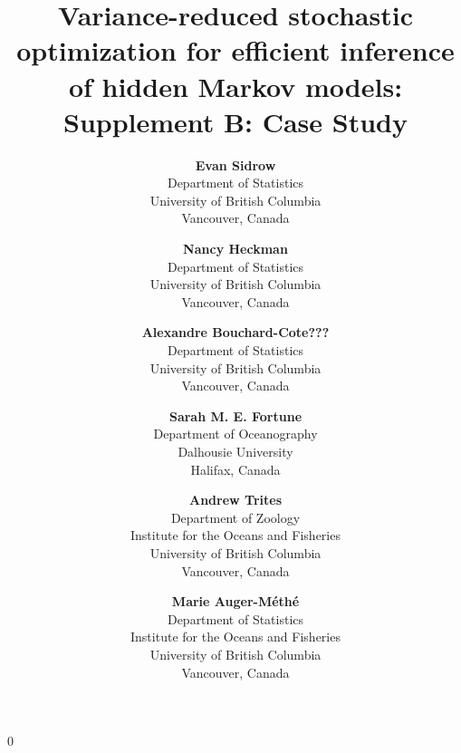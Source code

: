 \documentclass[12pt]{article}
\newcommand{\blind}{0}
\begin{document}
%

\def\spacingset#1{\renewcommand{\baselinestretch}%
{#1}\small\normalsize} \spacingset{1}


\blind
{
    \title{Variance-reduced stochastic optimization for efficient inference of hidden Markov models: Supplement B: Case Study}

    \author{
      \textbf{Evan Sidrow} \\
      Department of Statistics \\
      University of British Columbia\\
      Vancouver, Canada \\
      \and
      \textbf{Nancy Heckman} \\
      Department of Statistics \\
      University of British Columbia \\
      Vancouver, Canada \\
      \and
      \textbf{Alexandre Bouchard-Cote???} \\
      Department of Statistics \\
      University of British Columbia \\
      Vancouver, Canada \\
      \and
      \textbf{Sarah M. E. Fortune} \\
      Department of Oceanography \\
      Dalhousie University \\
      Halifax, Canada \\
      \and
      \textbf{Andrew Trites} \\
      Department of Zoology \\
      Institute for the Oceans and Fisheries \\
      University of British Columbia \\
      Vancouver, Canada \\
      \and
      \textbf{Marie Auger-M\'eth\'e} \\
      Department of Statistics \\
      Institute for the Oceans and Fisheries \\
      University of British Columbia \\
      Vancouver, Canada \\
    }
    \maketitle
} \fi
\end{document}

